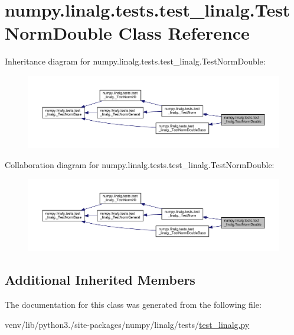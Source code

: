 \hypertarget{classnumpy_1_1linalg_1_1tests_1_1test__linalg_1_1TestNormDouble}{}\section{numpy.\+linalg.\+tests.\+test\+\_\+linalg.\+Test\+Norm\+Double Class Reference}
\label{classnumpy_1_1linalg_1_1tests_1_1test__linalg_1_1TestNormDouble}


Inheritance diagram for numpy.\+linalg.\+tests.\+test\+\_\+linalg.\+Test\+Norm\+Double\+:
\nopagebreak
\begin{figure}[H]
\begin{center}
\leavevmode
\includegraphics[width=350pt]{classnumpy_1_1linalg_1_1tests_1_1test__linalg_1_1TestNormDouble__inherit__graph}
\end{center}
\end{figure}


Collaboration diagram for numpy.\+linalg.\+tests.\+test\+\_\+linalg.\+Test\+Norm\+Double\+:
\nopagebreak
\begin{figure}[H]
\begin{center}
\leavevmode
\includegraphics[width=350pt]{classnumpy_1_1linalg_1_1tests_1_1test__linalg_1_1TestNormDouble__coll__graph}
\end{center}
\end{figure}
\subsection*{Additional Inherited Members}


The documentation for this class was generated from the following file\+:\begin{DoxyCompactItemize}
\item 
venv/lib/python3./site-\/packages/numpy/linalg/tests/\hyperlink{test__linalg_8py}{test\+\_\+linalg.\+py}\end{DoxyCompactItemize}
